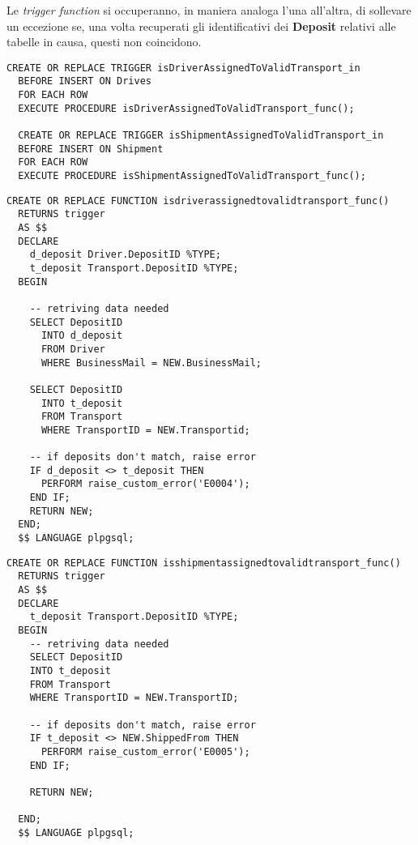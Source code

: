 Le \textit{trigger function} si occuperanno, in maniera analoga l'una all'altra, di sollevare un eccezione se, una volta recuperati gli identificativi dei \textbf{Deposit} relativi alle tabelle in causa, questi non coincidono.

\begin{lstlisting}[caption={Trigger per i vincoli \textbf{isAssignedToValidTransport}}]
  CREATE OR REPLACE TRIGGER isDriverAssignedToValidTransport_in
  BEFORE INSERT ON Drives
  FOR EACH ROW
  EXECUTE PROCEDURE isDriverAssignedToValidTransport_func();

  CREATE OR REPLACE TRIGGER isShipmentAssignedToValidTransport_in
  BEFORE INSERT ON Shipment
  FOR EACH ROW
  EXECUTE PROCEDURE isShipmentAssignedToValidTransport_func();
\end{lstlisting}

\begin{lstlisting}[caption={Funzione per il vincolo \textbf{isDriverAssignedToValidTransport}}]
  CREATE OR REPLACE FUNCTION isdriverassignedtovalidtransport_func() 
  RETURNS trigger
  AS $$
  DECLARE
    d_deposit Driver.DepositID %TYPE;
    t_deposit Transport.DepositID %TYPE;
  BEGIN

    -- retriving data needed
    SELECT DepositID
      INTO d_deposit
      FROM Driver
      WHERE BusinessMail = NEW.BusinessMail;

    SELECT DepositID
      INTO t_deposit
      FROM Transport
      WHERE TransportID = NEW.Transportid;

    -- if deposits don't match, raise error
    IF d_deposit <> t_deposit THEN
      PERFORM raise_custom_error('E0004');
    END IF;
    RETURN NEW;
  END;
  $$ LANGUAGE plpgsql;
\end{lstlisting}

\begin{lstlisting}[caption={Funzione per il vincolo \textbf{isShipmentAssignedToValidTransport}}]
  CREATE OR REPLACE FUNCTION isshipmentassignedtovalidtransport_func() 
  RETURNS trigger
  AS $$
  DECLARE
    t_deposit Transport.DepositID %TYPE;
  BEGIN
    -- retriving data needed
    SELECT DepositID
    INTO t_deposit
    FROM Transport
    WHERE TransportID = NEW.TransportID;

    -- if deposits don't match, raise error
    IF t_deposit <> NEW.ShippedFrom THEN
      PERFORM raise_custom_error('E0005');
    END IF;

    RETURN NEW;

  END;
  $$ LANGUAGE plpgsql;
\end{lstlisting}

